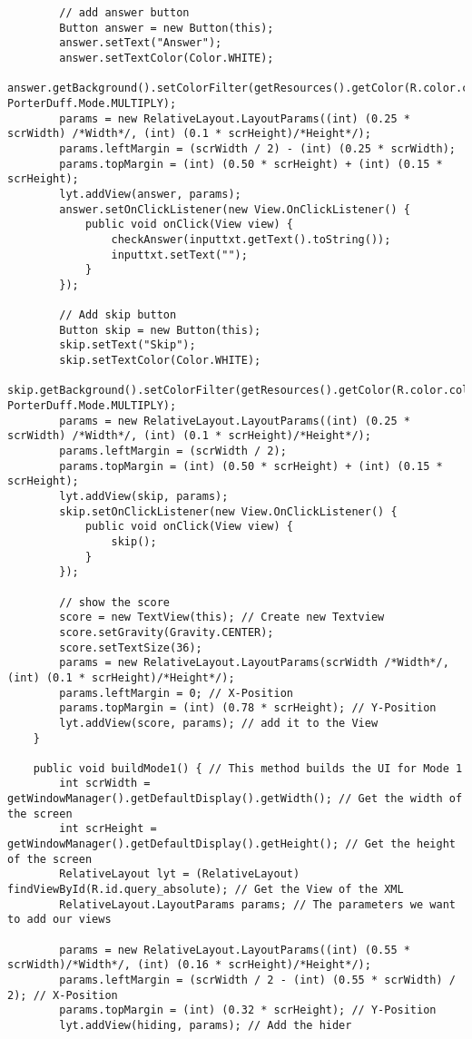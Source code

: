 \begin{lstlisting}
        // add answer button
        Button answer = new Button(this);
        answer.setText("Answer");
        answer.setTextColor(Color.WHITE);
        answer.getBackground().setColorFilter(getResources().getColor(R.color.colorAccent), PorterDuff.Mode.MULTIPLY);
        params = new RelativeLayout.LayoutParams((int) (0.25 * scrWidth) /*Width*/, (int) (0.1 * scrHeight)/*Height*/);
        params.leftMargin = (scrWidth / 2) - (int) (0.25 * scrWidth);
        params.topMargin = (int) (0.50 * scrHeight) + (int) (0.15 * scrHeight);
        lyt.addView(answer, params);
        answer.setOnClickListener(new View.OnClickListener() {
            public void onClick(View view) {
                checkAnswer(inputtxt.getText().toString());
                inputtxt.setText("");
            }
        });

        // Add skip button
        Button skip = new Button(this);
        skip.setText("Skip");
        skip.setTextColor(Color.WHITE);
        skip.getBackground().setColorFilter(getResources().getColor(R.color.colorPrimary), PorterDuff.Mode.MULTIPLY);
        params = new RelativeLayout.LayoutParams((int) (0.25 * scrWidth) /*Width*/, (int) (0.1 * scrHeight)/*Height*/);
        params.leftMargin = (scrWidth / 2);
        params.topMargin = (int) (0.50 * scrHeight) + (int) (0.15 * scrHeight);
        lyt.addView(skip, params);
        skip.setOnClickListener(new View.OnClickListener() {
            public void onClick(View view) {
                skip();
            }
        });

        // show the score
        score = new TextView(this); // Create new Textview
        score.setGravity(Gravity.CENTER);
        score.setTextSize(36);
        params = new RelativeLayout.LayoutParams(scrWidth /*Width*/, (int) (0.1 * scrHeight)/*Height*/);
        params.leftMargin = 0; // X-Position
        params.topMargin = (int) (0.78 * scrHeight); // Y-Position
        lyt.addView(score, params); // add it to the View
    }

    public void buildMode1() { // This method builds the UI for Mode 1
        int scrWidth = getWindowManager().getDefaultDisplay().getWidth(); // Get the width of the screen
        int scrHeight = getWindowManager().getDefaultDisplay().getHeight(); // Get the height of the screen
        RelativeLayout lyt = (RelativeLayout) findViewById(R.id.query_absolute); // Get the View of the XML
        RelativeLayout.LayoutParams params; // The parameters we want to add our views

        params = new RelativeLayout.LayoutParams((int) (0.55 * scrWidth)/*Width*/, (int) (0.16 * scrHeight)/*Height*/);
        params.leftMargin = (scrWidth / 2 - (int) (0.55 * scrWidth) / 2); // X-Position
        params.topMargin = (int) (0.32 * scrHeight); // Y-Position
        lyt.addView(hiding, params); // Add the hider


\end{lstlisting}

